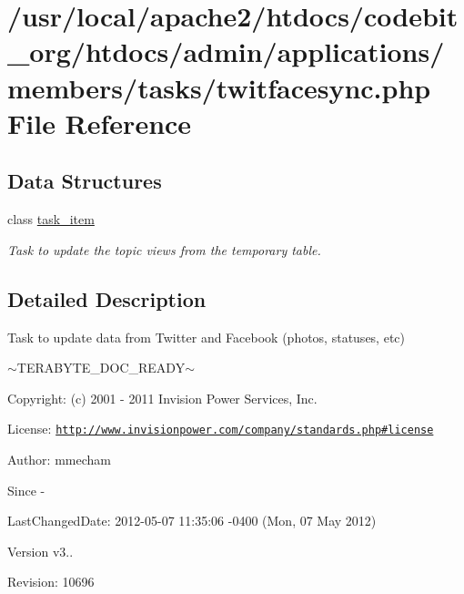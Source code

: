\hypertarget{twitfacesync_8php}{\section{/usr/local/apache2/htdocs/codebit\-\_\-org/htdocs/admin/applications/members/tasks/twitfacesync.php File Reference}
\label{twitfacesync_8php}
}
\subsection*{Data Structures}
\begin{DoxyCompactItemize}
\item 
class \hyperlink{classtask__item}{task\-\_\-item}
\begin{DoxyCompactList}\small\item\em Task to update the topic views from the temporary table. \end{DoxyCompactList}\end{DoxyCompactItemize}


\subsection{Detailed Description}
\begin{DoxyVerb}  Task to update data from Twitter and Facebook (photos, statuses, etc)
\end{DoxyVerb}
 $\sim$\-T\-E\-R\-A\-B\-Y\-T\-E\-\_\-\-D\-O\-C\-\_\-\-R\-E\-A\-D\-Y$\sim$ \begin{DoxyParagraph}{Copyright\-:}
(c) 2001 -\/ 2011 Invision Power Services, Inc.
\end{DoxyParagraph}
\begin{DoxyParagraph}{License\-:}
\href{http://www.invisionpower.com/company/standards.php#license}{\tt http\-://www.\-invisionpower.\-com/company/standards.\-php\#license}
\end{DoxyParagraph}
\begin{DoxyParagraph}{Author\-:}
mmecham 
\end{DoxyParagraph}
\begin{DoxySince}{Since}
-\/ 
\end{DoxySince}
\begin{DoxyParagraph}{Last\-Changed\-Date\-:}
2012-\/05-\/07 11\-:35\-:06 -\/0400 (Mon, 07 May 2012) 
\end{DoxyParagraph}
\begin{DoxyVersion}{Version}
v3.. 
\end{DoxyVersion}
\begin{DoxyParagraph}{Revision\-:}
10696 
\end{DoxyParagraph}
